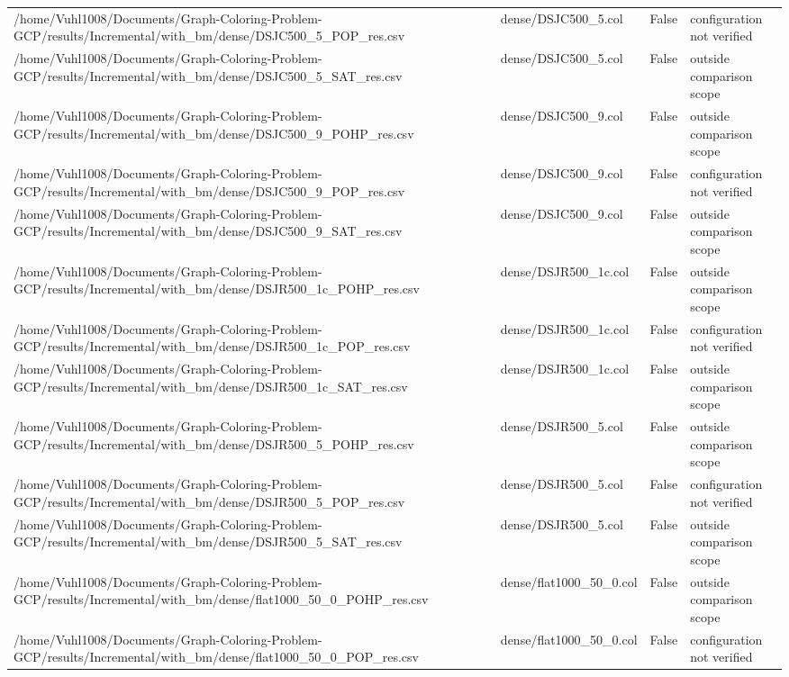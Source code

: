 \begin{table}[htbp]
\begin{tabular}{llll}
/home/Vuhl1008/Documents/Graph-Coloring-Problem-GCP/results/Incremental/with\_bm/dense/DSJC500\_5\_POP\_res.csv & dense/DSJC500\_5.col & False & configuration not verified \\
/home/Vuhl1008/Documents/Graph-Coloring-Problem-GCP/results/Incremental/with\_bm/dense/DSJC500\_5\_SAT\_res.csv & dense/DSJC500\_5.col & False & outside comparison scope \\
/home/Vuhl1008/Documents/Graph-Coloring-Problem-GCP/results/Incremental/with\_bm/dense/DSJC500\_9\_POHP\_res.csv & dense/DSJC500\_9.col & False & outside comparison scope \\
/home/Vuhl1008/Documents/Graph-Coloring-Problem-GCP/results/Incremental/with\_bm/dense/DSJC500\_9\_POP\_res.csv & dense/DSJC500\_9.col & False & configuration not verified \\
/home/Vuhl1008/Documents/Graph-Coloring-Problem-GCP/results/Incremental/with\_bm/dense/DSJC500\_9\_SAT\_res.csv & dense/DSJC500\_9.col & False & outside comparison scope \\
/home/Vuhl1008/Documents/Graph-Coloring-Problem-GCP/results/Incremental/with\_bm/dense/DSJR500\_1c\_POHP\_res.csv & dense/DSJR500\_1c.col & False & outside comparison scope \\
/home/Vuhl1008/Documents/Graph-Coloring-Problem-GCP/results/Incremental/with\_bm/dense/DSJR500\_1c\_POP\_res.csv & dense/DSJR500\_1c.col & False & configuration not verified \\
/home/Vuhl1008/Documents/Graph-Coloring-Problem-GCP/results/Incremental/with\_bm/dense/DSJR500\_1c\_SAT\_res.csv & dense/DSJR500\_1c.col & False & outside comparison scope \\
/home/Vuhl1008/Documents/Graph-Coloring-Problem-GCP/results/Incremental/with\_bm/dense/DSJR500\_5\_POHP\_res.csv & dense/DSJR500\_5.col & False & outside comparison scope \\
/home/Vuhl1008/Documents/Graph-Coloring-Problem-GCP/results/Incremental/with\_bm/dense/DSJR500\_5\_POP\_res.csv & dense/DSJR500\_5.col & False & configuration not verified \\
/home/Vuhl1008/Documents/Graph-Coloring-Problem-GCP/results/Incremental/with\_bm/dense/DSJR500\_5\_SAT\_res.csv & dense/DSJR500\_5.col & False & outside comparison scope \\
/home/Vuhl1008/Documents/Graph-Coloring-Problem-GCP/results/Incremental/with\_bm/dense/flat1000\_50\_0\_POHP\_res.csv & dense/flat1000\_50\_0.col & False & outside comparison scope \\
/home/Vuhl1008/Documents/Graph-Coloring-Problem-GCP/results/Incremental/with\_bm/dense/flat1000\_50\_0\_POP\_res.csv & dense/flat1000\_50\_0.col & False & configuration not verified \\

\end{tabular}
\end{table}
